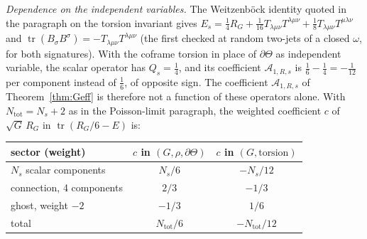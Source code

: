 \emph{Dependence on the independent variables.} The Weitzenb\"ock identity quoted in the paragraph on the torsion invariant gives \(E_s=\tfrac14R_G+\tfrac1{16}T_{\lambda\mu\nu}T^{\lambda\mu\nu}+\tfrac18T_{\lambda\mu\nu}T^{\mu\lambda\nu}\) and \(\operatorname{tr}(B_\sigma B^\sigma)=-T_{\lambda\mu\nu}T^{\lambda\mu\nu}\) (the first checked at random two-jets of a closed \(\omega\), for both signatures). With the coframe torsion in place of \(\partial\Theta\) as independent variable, the scalar operator has \(Q_s=\tfrac14\), and its coefficient \(\mathcal A_{1,R,s}\) is \(\tfrac16-\tfrac14=-\tfrac1{12}\) per component instead of \(\tfrac16\), of opposite sign. The coefficient \(\mathcal A_{1,R,s}\) of Theorem~\ref{thm:Geff} is therefore not a function of these operators alone. With \(N_{\mathrm{tot}}=N_s+2\) as in the Poisson-limit paragraph, the weighted coefficient \(c\) of \(\sqrt G\,R_G\) in \(\operatorname{tr}(R_G/6-E)\) is:

\begin{center}

\begin{tabular}{@{}lcc@{}}

\toprule

sector (weight) & \(c\) in \((G,\rho,\partial\Theta)\) & \(c\) in \((G,\text{torsion})\)\\

\midrule

\(N_s\) scalar components & \(N_s/6\) & \(-N_s/12\)\\

connection, 4 components & \(2/3\) & \(-1/3\)\\

ghost, weight \(-2\) & \(-1/3\) & \(1/6\)\\

total & \(N_{\mathrm{tot}}/6\) & \(-N_{\mathrm{tot}}/12\)\\

\bottomrule

\end{tabular}

\end{center}



